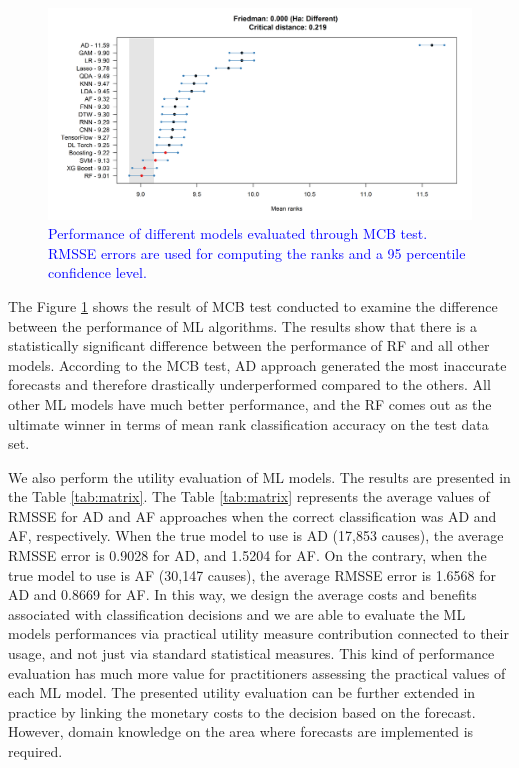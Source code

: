 \documentclass[preprint, 3p,
authoryear]{elsarticle} %
\begin{document}
\begin{figure}[H]

{\centering \includegraphics[width=1\linewidth]{img/Fig_MCB_all(review)} 

}

\caption{\textcolor{blue}{Performance of different models evaluated through MCB test. RMSSE errors are used for computing the ranks and a 95 percentile confidence level.}}\label{fig:MCB_ML}
\end{figure}

The Figure \ref{fig:MCB_ML} shows the result of MCB test conducted to
examine the difference between the performance of ML algorithms. The
results show that there is a statistically significant difference
between the performance of RF and all other models. According to the MCB
test, AD approach generated the most inaccurate forecasts and therefore
drastically underperformed compared to the others. All other ML models
have much better performance, and the RF comes out as the ultimate
winner in terms of mean rank classification accuracy on the test data
set.

We also perform the utility evaluation of ML models. The results are
presented in the Table \ref{tab:matrix}. The Table \ref{tab:matrix}
represents the average values of RMSSE for AD and AF approaches when the
correct classification was AD and AF, respectively. When the true model
to use is AD (17,853 causes), the average RMSSE error is 0.9028 for AD,
and 1.5204 for AF. On the contrary, when the true model to use is AF
(30,147 causes), the average RMSSE error is 1.6568 for AD and 0.8669 for
AF. In this way, we design the average costs and benefits associated
with classification decisions and we are able to evaluate the ML models
performances via practical utility measure contribution connected to
their usage, and not just via standard statistical measures. This kind
of performance evaluation has much more value for practitioners
assessing the practical values of each ML model. The presented utility
evaluation can be further extended in practice by linking the monetary
costs to the decision based on the forecast. However, domain knowledge
on the area where forecasts are implemented is required.
\end{document}
